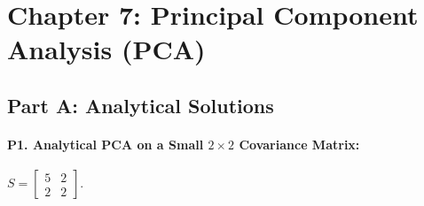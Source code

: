 \section*{Chapter 7: Principal Component Analysis (PCA)}

\subsection*{Part A: Analytical Solutions}

\paragraph{P1. Analytical PCA on a Small $2 \times 2$ Covariance Matrix:}
$S = \begin{bmatrix} 5 & 2 \\ 2 & 2 \end{bmatrix}$.

